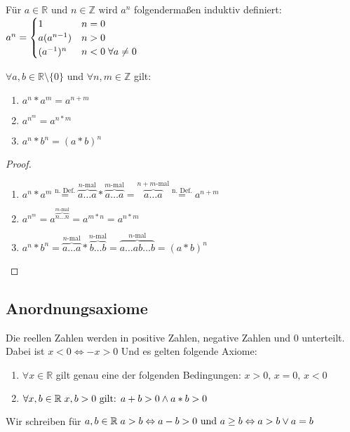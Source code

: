 \documentclass[a4paper,titlepage,oneside]{article}
\def\Z{\ensuremath{\mathbb{Z}} }
\def\R{\ensuremath{\mathbb{R}} }
\def\fa{\ensuremath{\forall}}
\def\lor{\ensuremath{\vee}}
\def\land{\ensuremath{\wedge}}
\def\sp{\hspace{0,1cm}}
\theoremstyle{thmstyle}
\begin{document}
\begin{subdefi}[Potenzschreibweise]
Für \(a \in \R \text{ und }n \in \Z \text{ wird }a^n\) folgendermaßen induktiv definiert:
$a^n = \begin{cases} 1 			& n = 0\\
				a(a^{n-1}) 	& n > 0\\
				(a^{-1})^n 	& n < 0 \sp \forall a \ne 0 \end{cases}$
\end{subdefi}

\begin{subbem}
\(\fa a, b \in \R \setminus \{0\} \) und \( \fa n, m \in \Z\) gilt:
\begin{multicols}{3}
\begin{enumerate}[label=(\arabic*)]
	\item $\displaystyle a^n * a^m = a^{n+m} $
	\item $\displaystyle a^{n^m} = a^{n * m} $
	\item $\displaystyle a^n * b^n = (a * b)^n $
\end{enumerate}
\end{multicols}
\begin{proof}\sp
\begin{enumerate}[label=(\arabic*)]
	\item $\displaystyle a^n * a^m \overset{\text{n. Def.}}{=} \overbrace{a \dots a}^{n\text{-mal}}*\overbrace{a \dots a}^{m\text{-mal}} = \overbrace{a \dots a}^{n+m\text{-mal}} \overset{\text{n. Def.}}{=} a^{n+m}$
	\item $\displaystyle a^{n^m} = a^{\overbrace{n \dots n}^{m\text{-mal}}} = a^{m * n} = a^{n*m}$
	\item $\displaystyle a^n * b^n = \overbrace{a \dots a}^{n\text{-mal}}*\overbrace{b \dots b}^{n\text{-mal}} = \overbrace{a \dots a b \dots b}^{n\text{-mal}} = (a*b)^{n}$
\end{enumerate}
\end{proof}
\end{subbem}

\subsection{Anordnungsaxiome}
Die reellen Zahlen werden in positive Zahlen, negative Zahlen und 0 unterteilt. Dabei ist \(x < 0 \Leftrightarrow -x > 0\) Und es gelten folgende Axiome:
\begin{enumerate}[label=(\arabic*)]
	\item \(\fa x \in \R \) gilt genau eine der folgenden Bedingungen: \(x > 0\text{, } x = 0\text{, } x < 0 \)
	\item \(\fa x,b \in \R \sp x,b > 0 \text{ gilt: } a + b > 0 \land a * b > 0\)
\end{enumerate}
Wir schreiben für \(a, b \in \R \sp a > b \Leftrightarrow a - b > 0\text{ und }a \ge b \Leftrightarrow a > b \lor a = b \)
\end{document}
